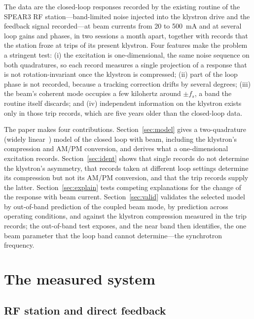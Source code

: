 The data are the closed-loop responses recorded by the existing routine of the SPEAR3 RF station---band-limited noise injected into the klystron drive and the feedback signal recorded---at beam currents from 20 to \SI{500}{mA} and at several loop gains and phases, in two sessions a month apart, together with records that the station froze at trips of its present klystron. Four features make the problem a stringent test: (i) the excitation is one-dimensional, the same noise sequence on both quadratures, so each record measures a single projection of a response that is not rotation-invariant once the klystron is compressed; (ii) part of the loop phase is not recorded, because a tracking correction drifts by several degrees; (iii) the beam's coherent mode occupies a few kilohertz around $\pm f_s$, a band the routine itself discards; and (iv) independent information on the klystron exists only in those trip records, which are five years older than the closed-loop data.

The paper makes four contributions. Section~\ref{sec:model} gives a two-quadrature (widely linear~\cite{Picinbono1995}) model of the closed loop with beam, including the klystron's compression and AM/PM conversion, and derives what a one-dimensional excitation records. Section~\ref{sec:ident} shows that single records do not determine the klystron's asymmetry, that records taken at different loop settings determine its compression but not its AM/PM conversion, and that the trip records supply the latter. Section~\ref{sec:explain} tests competing explanations for the change of the response with beam current. Section~\ref{sec:valid} validates the selected model by out-of-band prediction of the coupled beam mode, by prediction across operating conditions, and against the klystron compression measured in the trip records; the out-of-band test exposes, and the near band then identifies, the one beam parameter that the loop band cannot determine---the synchrotron frequency.

\section{The measured system}\label{sec:system}

\subsection{RF station and direct feedback}

